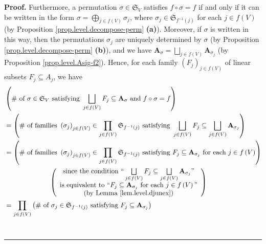 \documentclass[numbers=enddot,12pt,final,onecolumn,notitlepage]{scrartcl}%
\numberwithin{exer}{section}
\theoremstyle{definition}
\newenvironment{proof}[1][Proof]{\noindent\textbf{#1.} }{\ \rule{0.5em}{0.5em}}
\let\prodnonlimits\prod
\let\sqcupnonlimits\bigsqcup
\let\oplusnonlimits\bigoplus
\renewcommand{\prod}{\prodnonlimits\limits}
\renewcommand{\bigsqcup}{\sqcupnonlimits\limits}
\renewcommand{\bigoplus}{\oplusnonlimits\limits}
\newenvironment{vershort}{}{}
\begin{document}
\begin{vershort}
\begin{proof}
Furthermore, a permutation $\sigma\in\mathfrak{S}_{V}$ satisfies $f\circ
\sigma=f$ if and only if it can be written in the form $\sigma=\bigoplus_{j\in
f\left(  V\right)  }\sigma_{j}$, where $\sigma_{j}\in\mathfrak{S}%
_{f^{-1}\left(  j\right)  }$ for each $j\in f\left(  V\right)  $ (by
Proposition \ref{prop.level.decompose-perm} \textbf{(a)}). Moreover, if
$\sigma$ is written in this way, then the permutations $\sigma_{j}$ are
uniquely determined by $\sigma$ (by Proposition
\ref{prop.level.decompose-perm} \textbf{(b)}), and we have $\mathbf{A}%
_{\sigma}=\bigsqcup_{j\in f\left(  V\right)  }\mathbf{A}_{\sigma_{j}}$ (by
Proposition \ref{prop.level.Asig-f2}). Hence, for each family $\left(
F_{j}\right)  _{j\in f\left(  V\right)  }$ of linear subsets $F_{j}\subseteq
A_{j}$, we have%
\begin{align}
&  \left(  \text{\# of }\sigma\in\mathfrak{S}_{V}\text{ satisfying }%
\bigsqcup_{j\in f\left(  V\right)  }F_{j}\subseteq\mathbf{A}_{\sigma}\text{
and }f\circ\sigma=f\right) \nonumber\\
&  =\left(  \text{\# of families }\left(  \sigma_{j}\right)  _{j\in f\left(
V\right)  }\in\prod_{j\in f\left(  V\right)  }\mathfrak{S}_{f^{-1}\left(
j\right)  }\text{ satisfying }\bigsqcup_{j\in f\left(  V\right)  }%
F_{j}\subseteq\bigsqcup_{j\in f\left(  V\right)  }\mathbf{A}_{\sigma_{j}%
}\right) \nonumber\\
&  =\left(  \text{\# of families }\left(  \sigma_{j}\right)  _{j\in f\left(
V\right)  }\in\prod_{j\in f\left(  V\right)  }\mathfrak{S}_{f^{-1}\left(
j\right)  }\text{ satisfying }F_{j}\subseteq\mathbf{A}_{\sigma_{j}}\text{ for
each }j\in f\left(  V\right)  \right) \nonumber\\
&  \ \ \ \ \ \ \ \ \ \ \ \ \ \ \ \ \ \ \ \ \left(
\begin{array}
[c]{c}%
\text{since the condition \textquotedblleft}\bigsqcup_{j\in f\left(  V\right)
}F_{j}\subseteq\bigsqcup_{j\in f\left(  V\right)  }\mathbf{A}_{\sigma_{j}%
}\text{\textquotedblright}\\
\text{is equivalent to \textquotedblleft}F_{j}\subseteq\mathbf{A}_{\sigma_{j}%
}\text{ for each }j\in f\left(  V\right)  \text{\textquotedblright}\\
\text{(by Lemma \ref{lem.level.djunex})}%
\end{array}
\right) \nonumber\\
&  =\prod_{j\in f\left(  V\right)  }\left(  \text{\# of }\sigma_{j}%
\in\mathfrak{S}_{f^{-1}\left(  j\right)  }\text{ satisfying }F_{j}%
\subseteq\mathbf{A}_{\sigma_{j}}\right) \nonumber\\

\end{align}
\end{proof}
\end{vershort}
\end{document}
